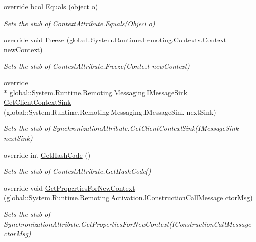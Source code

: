 \begin{DoxyCompactItemize}
override bool \hyperlink{class_system_1_1_runtime_1_1_remoting_1_1_contexts_1_1_fakes_1_1_stub_synchronization_attribute_adc582fa782ac2c0de8ffb4f2827cb81c}{Equals} (object o)
\begin{DoxyCompactList}\small\item\em Sets the stub of Context\-Attribute.\-Equals(\-Object o)\end{DoxyCompactList}\item 
override void \hyperlink{class_system_1_1_runtime_1_1_remoting_1_1_contexts_1_1_fakes_1_1_stub_synchronization_attribute_a44edf4c91feb376ca0466cd56f1a766a}{Freeze} (global\-::\-System.\-Runtime.\-Remoting.\-Contexts.\-Context new\-Context)
\begin{DoxyCompactList}\small\item\em Sets the stub of Context\-Attribute.\-Freeze(\-Context new\-Context)\end{DoxyCompactList}\item 
override \\*
global\-::\-System.\-Runtime.\-Remoting.\-Messaging.\-I\-Message\-Sink \hyperlink{class_system_1_1_runtime_1_1_remoting_1_1_contexts_1_1_fakes_1_1_stub_synchronization_attribute_a1585fc96edd001ff10ada5959f8c56d2}{Get\-Client\-Context\-Sink} (global\-::\-System.\-Runtime.\-Remoting.\-Messaging.\-I\-Message\-Sink next\-Sink)
\begin{DoxyCompactList}\small\item\em Sets the stub of Synchronization\-Attribute.\-Get\-Client\-Context\-Sink(\-I\-Message\-Sink next\-Sink)\end{DoxyCompactList}\item 
override int \hyperlink{class_system_1_1_runtime_1_1_remoting_1_1_contexts_1_1_fakes_1_1_stub_synchronization_attribute_a9b7b0a40901bbc7cf0f28dee081bc351}{Get\-Hash\-Code} ()
\begin{DoxyCompactList}\small\item\em Sets the stub of Context\-Attribute.\-Get\-Hash\-Code()\end{DoxyCompactList}\item 
override void \hyperlink{class_system_1_1_runtime_1_1_remoting_1_1_contexts_1_1_fakes_1_1_stub_synchronization_attribute_aa1ad3d6fd1f36ff52a69880fe99d7d2e}{Get\-Properties\-For\-New\-Context} (global\-::\-System.\-Runtime.\-Remoting.\-Activation.\-I\-Construction\-Call\-Message ctor\-Msg)
\begin{DoxyCompactList}\small\item\em Sets the stub of Synchronization\-Attribute.\-Get\-Properties\-For\-New\-Context(\-I\-Construction\-Call\-Message ctor\-Msg)\end{DoxyCompactList}\item 

\end{DoxyCompactItemize}
